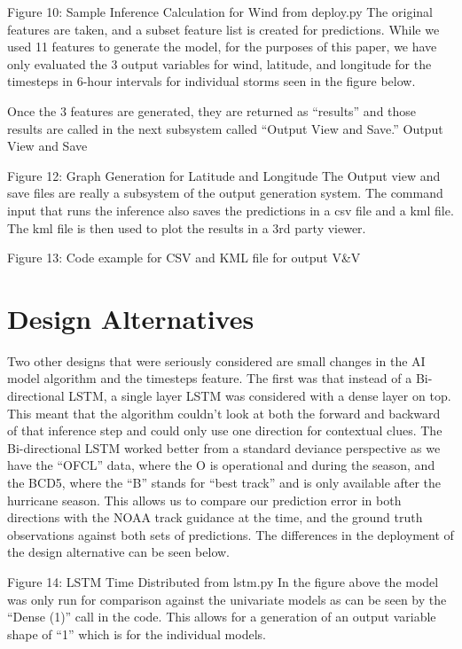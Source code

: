 \documentclass{article}
\begin{document}
Figure 10: Sample Inference Calculation for Wind from deploy.py
The original features are taken, and a subset feature list is created for predictions. While we used 11 features to generate the model, for the purposes of this paper, we have only evaluated the 3 output variables for wind, latitude, and longitude for the timesteps in 6-hour intervals for individual storms seen in the figure below.


Once the 3 features are generated, they are returned as ``results'' and those results are called in the next subsystem called “Output View and Save.”
Output View and Save 

Figure 12: Graph Generation for Latitude and Longitude
The Output view and save files are really a subsystem of the output generation system. The command input that runs the inference also saves the predictions in a csv file and a kml file. The kml file is then used to plot the results in a 3rd party viewer. 


Figure 13: Code example for CSV and KML file for output V\&V

\section{Design Alternatives}
Two other designs that were seriously considered are small changes in the AI model algorithm and the timesteps feature. The first was that instead of a Bi-directional LSTM, a single layer LSTM was considered with a dense layer on top. This meant that the algorithm couldn’t look at both the forward and backward of that inference step and could only use one direction for contextual clues. The Bi-directional LSTM worked better from a standard deviance perspective as we have the “OFCL” data, where the O is operational and during the season, and the BCD5, where the “B” stands for “best track” and is only available after the hurricane season. This allows us to compare our prediction error in both directions with the NOAA track guidance at the time, and the ground truth observations against both sets of predictions. The differences in the deployment of the design alternative can be seen below.

Figure 14: LSTM Time Distributed from lstm.py
In the figure above the model was only run for comparison against the univariate models as can be seen by the “Dense (1)” call in the code. This allows for a generation of an output variable shape of “1” which is for the individual models.
\end{document}
